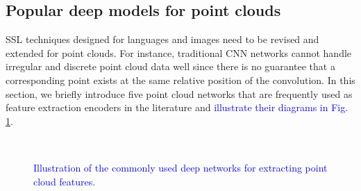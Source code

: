 \documentclass[a4paper,fleqn]{cas-dc}
\begin{document}
\subsection{Popular deep models for point clouds}\label{sec:models}
SSL techniques designed for languages and images need to be revised and extended for point clouds. For instance, traditional CNN networks cannot handle irregular and discrete point cloud data well since there is no guarantee that a corresponding point exists at the same relative position of the convolution. In this section, we briefly introduce five point cloud networks that are frequently used as feature extraction encoders in the literature and \textcolor{blue}{illustrate their diagrams in Fig. \ref{fig:models}.}


\begin{figure}
    \centering
    \\

        \caption{\textcolor{blue}{Illustration of the commonly used deep networks for extracting point cloud features.}}
        \label{fig:models}
    
\end{figure}     
 
\end{document}
